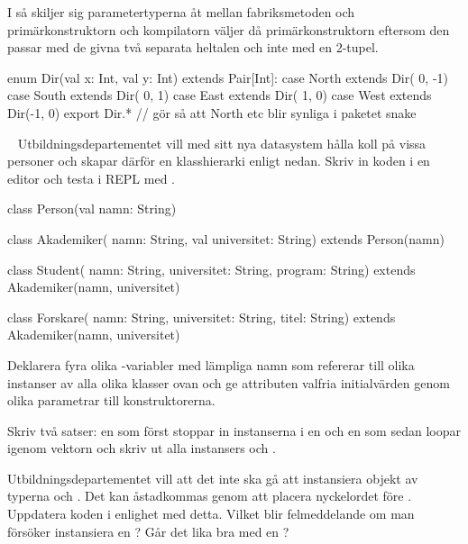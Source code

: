 I  så skiljer sig parametertyperna åt mellan fabriksmetoden och primärkonstruktorn och kompilatorn väljer då primärkonstruktorn eftersom den passar med de givna två separata heltalen och inte med en 2-tupel.

\SubtaskSolved
\begin{CodeSmall}
enum Dir(val x: Int, val y: Int) extends Pair[Int]:
  case North extends Dir( 0, -1)
  case South extends Dir( 0,  1)
  case East  extends Dir( 1,  0)
  case West  extends Dir(-1,  0)
export Dir.*  // gör så att North etc blir synliga i paketet snake
\end{CodeSmall}

\QUESTEND







\QUESTBEGIN

\Task  \what~  Utbildningsdepartementet vill med sitt nya datasystem hålla koll på vissa personer och skapar därför en klasshierarki enligt nedan. Skriv in koden i en editor och testa i REPL med .
\begin{Code}
class Person(val namn: String)

class Akademiker(
  namn: String,
  val universitet: String) extends Person(namn)

class Student(
  namn: String,
  universitet: String,
  program: String) extends Akademiker(namn, universitet)

class Forskare(
  namn: String,
  universitet: String,
  titel: String) extends Akademiker(namn, universitet)
\end{Code}


\Subtask Deklarera fyra olika -variabler med lämpliga namn som refererar till olika instanser av alla olika klasser ovan och ge attributen valfria initialvärden genom olika parametrar till konstruktorerna.

\Subtask Skriv två satser: en som först stoppar in instanserna i en  och en som sedan loopar igenom vektorn och skriv ut alla instansers  och .

\Subtask Utbildningsdepartementet vill att det inte ska gå att instansiera objekt av typerna  och . Det kan åstadkommas genom att placera nyckelordet  före . Uppdatera koden i enlighet med detta. Vilket blir felmeddelande om man försöker instansiera en ? Går det lika bra med en ?

